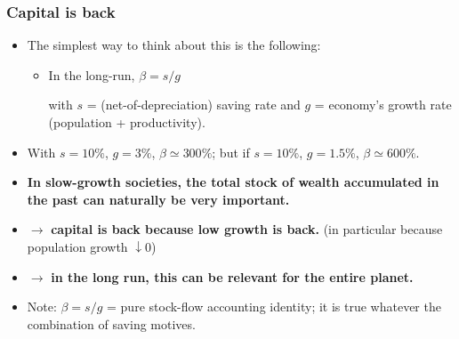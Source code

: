 \begin{frame}[label=CapitalIsBack]
\frametitle{Capital is back}
\begin{itemize}
\item
The simplest way to think about this is the following: 
\begin{itemize}
\item
In the long-run, $\beta = s/g$
\par\medskip
with $s$ = (net-of-depreciation) saving rate and $g$ = economy's growth rate (population + productivity).
\end{itemize}
\item
With $s = 10\%$, $g = 3\%$, $\beta \simeq 300\%$; but if $s = 10\%$, $g = 1.5\%$, $\beta \simeq 600\%$.
\item
\textbf{In slow-growth societies, the total stock of wealth accumulated in the past can naturally be very important.}
\item
$\rightarrow$ \textbf{capital is back because low growth is back.}
(in particular because population growth $\downarrow 0$)
\item
$\rightarrow$ \textbf{in the long run, this can be relevant for the entire planet.}
\item
Note: $\beta = s/g$ = pure stock-flow accounting identity; it is true whatever the combination of saving motives.
\end{itemize}
\end{frame}


